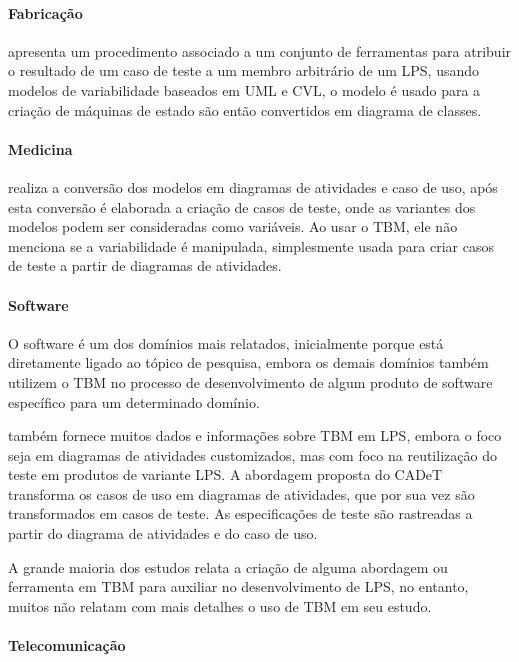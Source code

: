 \paragraph{\textbf{Fabricação}}

\citet{knapp2014use} apresenta um procedimento associado a um conjunto de ferramentas para atribuir o resultado de um caso de teste a um membro arbitrário de um LPS, usando modelos de variabilidade baseados em UML e CVL, o modelo é usado para a criação de máquinas de estado são então convertidos em diagrama de classes.

\paragraph{\textbf{Medicina}}

\citet{hasling2008model} realiza a conversão dos modelos em diagramas de atividades e caso de uso, após esta conversão é elaborada a criação de casos de teste, onde as variantes dos modelos podem ser consideradas como variáveis. Ao usar o TBM, ele não menciona se a variabilidade é manipulada, simplesmente usada para criar casos de teste a partir de diagramas de atividades.

\paragraph{\textbf{Software}}

O software é um dos domínios mais relatados, inicialmente porque está diretamente ligado ao tópico de pesquisa, embora os demais domínios também utilizem o TBM no processo de desenvolvimento de algum produto de software específico para um determinado domínio.

\citet{Olimpiew2008} também fornece muitos dados e informações sobre TBM em LPS, embora o foco seja em diagramas de atividades customizados, mas com foco na reutilização do teste em produtos de variante LPS. A abordagem proposta do CADeT transforma os casos de uso em diagramas de atividades, que por sua vez são transformados em casos de teste. As especificações de teste são rastreadas a partir do diagrama de atividades e do caso de uso.

A grande maioria dos estudos relata a criação de alguma abordagem ou ferramenta em TBM para auxiliar no desenvolvimento de LPS, no entanto, muitos não relatam com mais detalhes o uso de TBM em seu estudo.

\paragraph{\textbf{Telecomunicação}}

